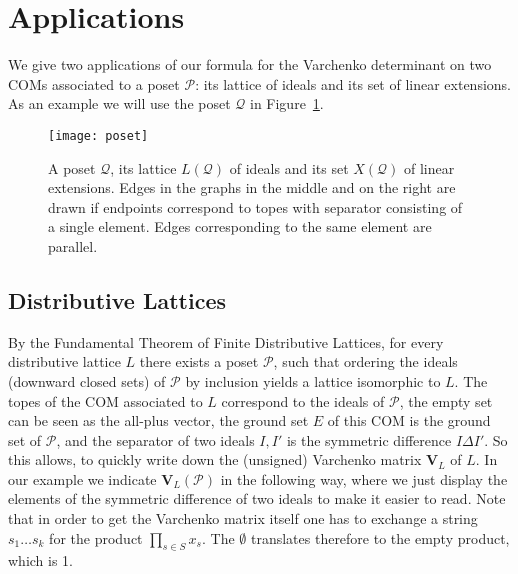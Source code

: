 \documentclass[12pt]{amsart}
\theoremstyle{plain}
\numberwithin{Lemma}{\DefaultNumberTheoremWithin}
\numberwithin{Claim}{\DefaultNumberTheoremWithin}
\numberwithin{Theorem}{\DefaultNumberTheoremWithin}
\numberwithin{Corollary}{\DefaultNumberTheoremWithin}
\numberwithin{Proposition}{\DefaultNumberTheoremWithin}
\numberwithin{Conjecture}{\DefaultNumberTheoremWithin}
\numberwithin{Situation}{\DefaultNumberTheoremWithin}
\numberwithin{Note}{\DefaultNumberTheoremWithin}
\theoremstyle{definition}
\numberwithin{Definition}{\DefaultNumberTheoremWithin}
\theoremstyle{definition}
\numberwithin{Question}{\DefaultNumberTheoremWithin}
\theoremstyle{definition}
\numberwithin{Problem}{\DefaultNumberTheoremWithin}
\theoremstyle{remark} \newtheorem{Remark}{Remark}
\numberwithin{Remark}{\DefaultNumberTheoremWithin}
\theoremstyle{remark}
\numberwithin{Example}{\DefaultNumberTheoremWithin}
\numberwithin{Case}{Lemma}
\numberwithin{Step}{Lemma}
\begin{document}
\section{Applications}\label{sec:applications}
We give two applications of our formula for the Varchenko determinant on two COMs associated to a poset $\mathcal{P}$: its lattice of ideals and its set of linear extensions. As an example we will use the poset $\mathcal{Q}$ in Figure~\ref{fig:poset}.
 \begin{center}
 \begin{figure}
 \texttt{[image: poset]}
 \caption{A poset $\mathcal{Q}$, its lattice $L(\mathcal{Q})$ of ideals and its set $X(\mathcal{Q})$ of linear extensions. Edges in the graphs in the middle and on the right are drawn if endpoints correspond to topes with separator consisting of a single element. Edges corresponding to the same element are parallel.}\label{fig:poset}
  
 \end{figure}

 \end{center}

\subsection{Distributive Lattices}
By the Fundamental Theorem of Finite Distributive Lattices, for every distributive lattice $L$ there exists a poset $\mathcal{P}$, such that ordering the ideals (downward closed sets) of $\mathcal{P}$ by inclusion yields a lattice isomorphic to $L$. The topes of the COM associated to $L$ correspond to the ideals of $\mathcal{P}$, the empty set can be seen as the all-plus vector, the ground set $E$ of this COM is the ground set of $\mathcal{P}$, and the separator of two ideals $I,I'$ is the symmetric difference $I\Delta I'$. So this allows, to quickly write down the (unsigned) Varchenko matrix $\mathbf{V}_L$ of $L$. In our example we indicate $\mathbf{V}_L(\mathcal{P})$ in the following way, where we just display the elements of the symmetric difference of two ideals to make it easier to read. Note that in order to get the Varchenko matrix itself one has to exchange a string $s_1 \ldots s_k$ for the product $\prod_{s\in S}x_s$. The $\emptyset$ translates therefore to the empty product, which is 1.
\end{document}

